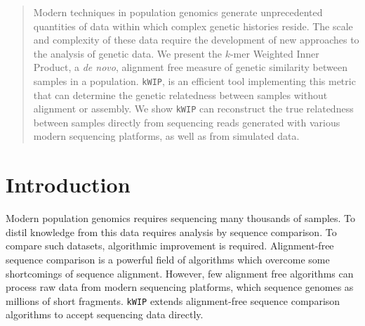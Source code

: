 \documentclass[a0,portrait]{a0poster}
\begin{document}
\begin{multicols}{2}


\begin{abstract}
\vspace{5mm}

Modern techniques in population genomics generate unprecedented quantities of
data within which complex genetic histories reside. The scale and complexity of
these data require the development of new approaches to the analysis of genetic
data. We present the $k$-mer Weighted Inner Product, a \textit{de novo},
alignment free measure of genetic similarity between samples in a population.
\texttt{kWIP}, is an efficient tool implementing this metric that can determine
the genetic relatedness between samples without alignment or assembly. We show
\texttt{kWIP} can reconstruct the true relatedness between samples directly
from sequencing reads generated with various modern sequencing platforms, as
well as from simulated data.

\end{abstract}


\section*{Introduction}

Modern population genomics requires sequencing many thousands of samples. To
distil knowledge from this data requires analysis by sequence comparison. To
compare such datasets, algorithmic improvement is required. Alignment-free
sequence comparison is a powerful field of algorithms which overcome some
shortcomings of sequence alignment. However, few alignment free algorithms can
process raw data from modern sequencing platforms, which sequence genomes as
millions of short fragments. \texttt{kWIP} extends alignment-free sequence
comparison algorithms to accept sequencing data directly.



\end{multicols}
\end{document}

